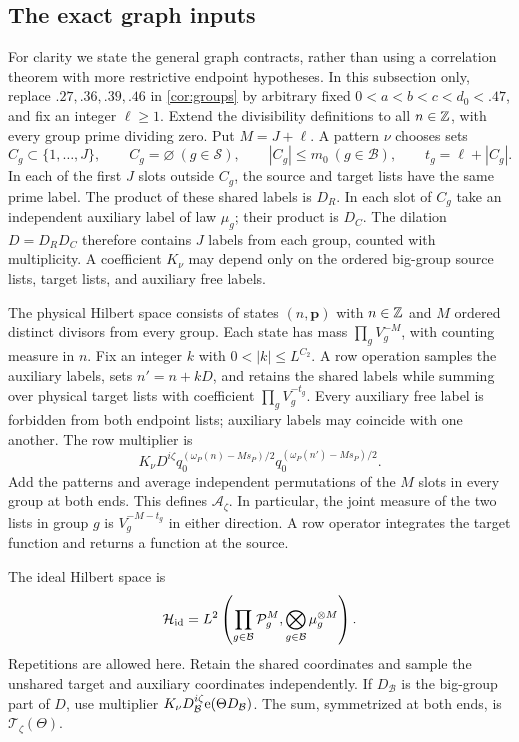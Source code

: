 \subsection{The exact graph inputs}

For clarity we state the general graph contracts, rather than using a
correlation theorem with more restrictive endpoint hypotheses.  In this
subsection only, replace $.27,.36,.39,.46$ in
\eqref{cor:groups} by arbitrary fixed $0<a<b<c<d_0<.47$, and fix an
integer $\ell\geq1$.  Extend the divisibility definitions to all
$n\in\mathbb Z$, with every group prime dividing zero.  Put $M=J+\ell$.
A pattern $\nu$ chooses sets
\[
 C_g\subset\{1,\ldots,J\},\qquad C_g=\varnothing\ (g\in\mathcal S),
 \qquad |C_g|\leq m_0\ (g\in\mathcal B),
 \qquad t_g=\ell+|C_g|.
\]
In each of the first $J$ slots outside $C_g$, the source and target
lists have the same prime label.  The product of these shared labels
is $D_R$.  In each slot of $C_g$ take an independent
auxiliary label of law $\mu_g$; their product is $D_C$.  The dilation
$D=D_RD_C$ therefore contains $J$ labels from each group, counted with
multiplicity.  A coefficient $K_\nu$ may depend only on the ordered
big-group source lists, target lists, and auxiliary free labels.

The physical Hilbert space consists of states $(n,\mathbf p)$ with
$n\in\mathbb Z$ and $M$ ordered distinct divisors from every group.  Each
state has mass $\prod_gV_g^{-M}$, with counting measure in $n$.
Fix an integer $k$ with $0<|k|\leq L^{C_2}$.  A row operation samples the auxiliary labels,
sets $n'=n+kD$, and retains the shared labels while summing over
physical target lists with coefficient $\prod_gV_g^{-t_g}$.
Every auxiliary free label is forbidden from both endpoint lists;
auxiliary labels may coincide with one another.  The row multiplier is
\begin{equation}\label{cor:physical-multiplier}
 K_\nu D^{i\zeta}
 q_0^{(\omega_P(n)-Ms_P)/2}
 q_0^{(\omega_P(n')-Ms_P)/2}.
\end{equation}
Add the patterns and average independent permutations of the $M$ slots
in every group at both ends.  This defines $\mathcal A_\zeta$.
In particular, the joint measure of the two lists in group $g$ is
$V_g^{-M-t_g}$ in either direction.  A row operator integrates the
target function and returns a function at the source.

The ideal Hilbert space is
\[
 \mathcal H_{\rm id}
  =L^2\left(\prod_{g\in\mathcal B}\mathcal P_g^M,
                \bigotimes_{g\in\mathcal B}\mu_g^{\otimes M}\right).
\]
Repetitions are allowed here.  Retain the shared coordinates and sample
the unshared target and auxiliary coordinates independently.  If
$D_{\mathcal B}$ is the big-group part of $D$, use multiplier
$K_\nu D_{\mathcal B}^{i\zeta}\mathrm{e}(\Theta D_{\mathcal B})$.
The sum, symmetrized at both ends, is $\mathcal T_\zeta(\Theta)$.

